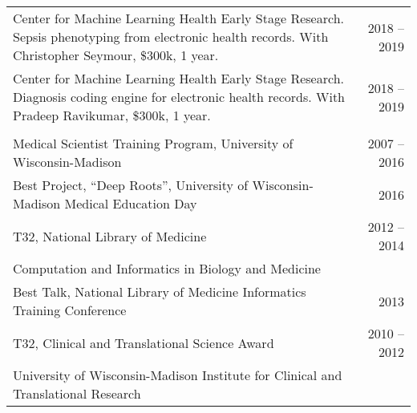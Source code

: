 

\begin{tabular}{ @{} p{} @{\hspace{2ex}} r }
  Center for Machine Learning Health Early Stage Research. Sepsis phenotyping from electronic health records. With Christopher Seymour, \$300k, 1 year. & \hfill 2018 -- 2019 \\
  Center for Machine Learning Health Early Stage Research. Diagnosis coding engine for electronic health records. With Pradeep Ravikumar, \$300k, 1 year. & \hfill 2018 -- 2019 \\

  & \\
Medical Scientist Training Program, University of Wisconsin-Madison & \hfill 2007 -- 2016\\
Best Project, ``Deep Roots'', University of Wisconsin-Madison Medical Education Day &\hfill 2016\\
T32, National Library of Medicine & 2012 -- 2014 \\
  \hspace{2em} Computation and Informatics in Biology and Medicine & \\
Best Talk, National Library of Medicine Informatics Training Conference & 2013 \\
T32, Clinical and Translational Science Award & 2010 -- 2012 \\
  \hspace{2em} University of Wisconsin-Madison Institute for Clinical and Translational Research &\\
  


\end{tabular}
